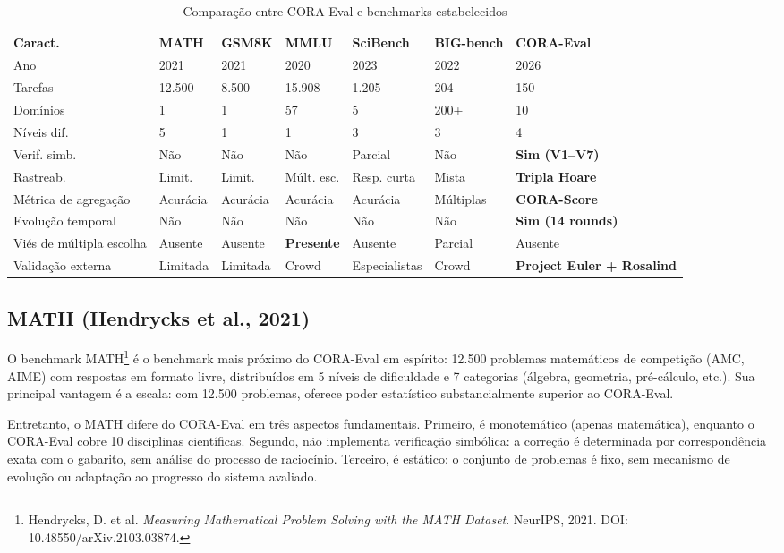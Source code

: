 \begin{table}[H]
\centering\footnotesize
\caption{Comparação entre CORA-Eval e benchmarks estabelecidos}
\label{tab:benchmark_comp}
\begin{tabular}{@{}p{1.8cm}p{1.5cm}p{1.6cm}p{1.4cm}p{1.8cm}p{1.8cm}p{2.2cm}@{}}
\toprule
\textbf{Caract.} & \textbf{MATH} & \textbf{GSM8K} & \textbf{MMLU} & \textbf{SciBench} & \textbf{BIG-bench} & \textbf{CORA-Eval} \\
\midrule
Ano & 2021 & 2021 & 2020 & 2023 & 2022 & 2026 \\
Tarefas & 12.500 & 8.500 & 15.908 & 1.205 & 204 & 150 \\
Domínios & 1 & 1 & 57 & 5 & 200+ & 10 \\
Níveis dif. & 5 & 1 & 1 & 3 & 3 & 4 \\
Verif. simb. & Não & Não & Não & Parcial & Não & \textbf{Sim (V1--V7)} \\
Rastreab. & Limit. & Limit. & Múlt. esc. & Resp. curta & Mista & \textbf{Tripla Hoare} \\
Métrica de agregação & Acurácia & Acurácia & Acurácia & Acurácia & Múltiplas & \textbf{CORA-Score} \\
Evolução temporal & Não & Não & Não & Não & Não & \textbf{Sim (14 rounds)} \\
Viés de múltipla escolha & Ausente & Ausente & \textbf{Presente} & Ausente & Parcial & Ausente \\
Validação externa & Limitada & Limitada & Crowd & Especialistas & Crowd & \textbf{Project Euler + Rosalind} \\
\bottomrule
\end{tabular}
\end{table}

\subsection{MATH (Hendrycks et al., 2021)}

O benchmark MATH\footnote{Hendrycks, D. et al. \textit{Measuring
Mathematical Problem Solving with the MATH Dataset}. NeurIPS, 2021. DOI:
10.48550/arXiv.2103.03874.} é o benchmark mais próximo do CORA-Eval em
espírito: 12.500 problemas matemáticos de competição (AMC, AIME) com
respostas em formato livre, distribuídos em 5 níveis de dificuldade e 7
categorias (álgebra, geometria, pré-cálculo, etc.). Sua principal
vantagem é a escala: com 12.500 problemas, oferece poder estatístico
substancialmente superior ao CORA-Eval.

Entretanto, o MATH difere do CORA-Eval em três aspectos fundamentais.
Primeiro, é monotemático (apenas matemática), enquanto o CORA-Eval cobre
10 disciplinas científicas. Segundo, não implementa verificação simbólica:
a correção é determinada por correspondência exata com o gabarito, sem
análise do processo de raciocínio. Terceiro, é estático: o conjunto de
problemas é fixo, sem mecanismo de evolução ou adaptação ao progresso do
sistema avaliado.

